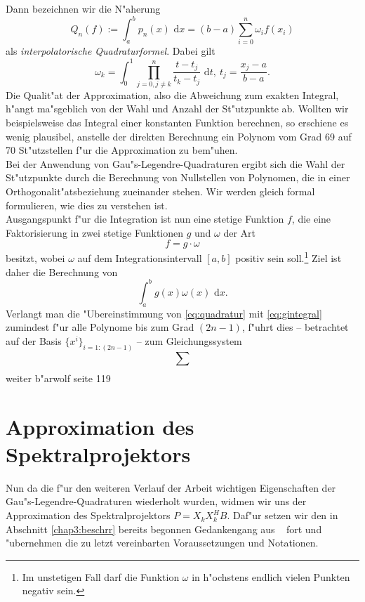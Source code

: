 Dann bezeichnen wir die N"aherung
\begin{equation}\label{eq:quadratur}
Q_n(f) := \int_a^b p_n (x)\text{ d}x =
(b-a)\sum_{i=0}^n \omega_i f(x_i)
\end{equation}
als \emph{interpolatorische Quadraturformel}. Dabei gilt
\[
\omega_k = \int_0^1 \prod_{j=0,j\neq k}^n
\frac{t-t_j}{t_k - t_j} \text{ d}t, \ t_j
= \frac{x_j-a}{b-a}.
\]
Die Qualit"at der Approximation, also die Abweichung zum exakten Integral, h"angt ma"sgeblich von der Wahl und Anzahl der St"utzpunkte ab. Wollten wir
beispielsweise das Integral einer konstanten Funktion berechnen, so erschiene es wenig plausibel, anstelle der direkten Berechnung ein Polynom vom Grad 69 auf 70 St"utzstellen f"ur die Approximation zu bem"uhen.\\

Bei der Anwendung von Gau"s-Legendre-Quadraturen ergibt sich die Wahl der St"utzpunkte durch die Berechnung von Nullstellen von Polynomen, die in einer Orthogonalit"atsbeziehung zueinander stehen.
Wir werden gleich formal formulieren, wie dies zu verstehen ist.\\

Ausgangspunkt f"ur die Integration ist nun eine stetige Funktion $f$, die eine Faktorisierung in zwei stetige Funktionen $g$ und $\omega$ der Art
\[
f = g\cdot \omega
\]
besitzt, wobei $\omega$ auf dem Integrationsintervall $[a,b]$ positiv sein soll.\footnote{Im unstetigen Fall darf die Funktion $\omega$ in h"ochstens endlich vielen Punkten negativ sein.} Ziel ist daher die Berechnung von
\begin{equation}\label{eq:gintegral}
\int_a^b g(x)\omega(x) \text{ d}x.
\end{equation}
Verlangt man die "Ubereinstimmung von \eqref{eq:quadratur} mit \eqref{eq:gintegral} zumindest f"ur alle Polynome bis zum Grad $(2n-1)$,
f"uhrt dies -- betrachtet auf der Basis $\{x^i\}_{i=1:(2n-1)}$ -- zum Gleichungssystem
\[
\sum_{}
\]
weiter b"arwolf seite 119

\section{Approximation des Spektralprojektors}

Nun da die f"ur den weiteren Verlauf der Arbeit wichtigen Eigenschaften der Gau"s-Legendre-Quadraturen wiederholt wurden, widmen wir uns der Approximation des Spektralprojektors
$P = X_k X_k^H B$. Daf"ur setzen wir den in Abschnitt \ref{chap3:beschrr} bereits begonnen Gedankengang aus ~\cite{ptep}
fort und "ubernehmen die zu letzt vereinbarten Voraussetzungen und Notationen.\\

